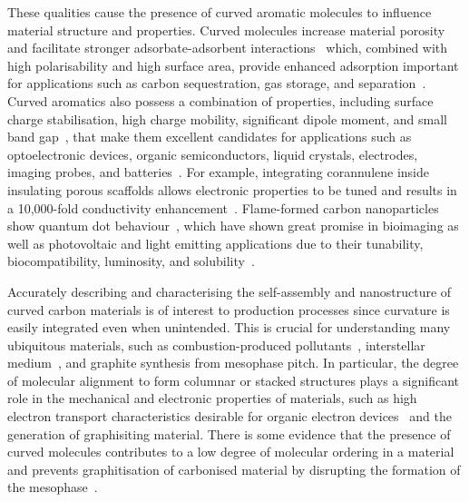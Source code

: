 These qualities cause the presence of curved aromatic molecules to influence material structure and properties. Curved molecules increase material porosity~\cite{Harris2005new} and facilitate stronger adsorbate-adsorbent interactions~\cite{Martin2017} which, combined with high polarisability and high surface area, provide enhanced adsorption important for applications such as carbon sequestration, gas storage, and separation~\cite{Scanlon2006investigation}. Curved aromatics also possess a combination of properties, including surface charge stabilisation, high charge mobility, significant dipole moment, and small band gap~\cite{Menon2019optical}, that make them excellent candidates for applications such as optoelectronic devices, organic semiconductors, liquid crystals, electrodes, imaging probes, and batteries~\cite{roch2017indenocorannulene}. For example, integrating corannulene inside insulating porous scaffolds allows electronic properties to be tuned and results in a 10,000-fold conductivity enhancement~\cite{rice2018stack}. Flame-formed carbon nanoparticles show quantum dot behaviour~\cite{liu2019flame}, which have shown great promise in bioimaging as well as photovoltaic and light emitting applications due to their tunability, biocompatibility, luminosity, and solubility~\cite{zhang2012graphene}.

Accurately describing and characterising the self-assembly and nanostructure of curved carbon materials is of interest to production processes since curvature is easily integrated even when unintended. This is crucial for understanding many ubiquitous materials, such as combustion-produced pollutants~\cite{Martin2018flexo}, interstellar medium~\cite{Lovas2005}, and graphite synthesis from mesophase pitch. In particular, the degree of molecular alignment to form columnar or stacked structures plays a significant role in the mechanical and electronic properties of materials, such as high electron transport characteristics desirable for organic electron devices~\cite{wang2015electronic} and the generation of graphisiting material. There is some evidence that the presence of curved molecules contributes to a low degree of molecular ordering in a material~\cite{zhong2018structural} and prevents graphitisation of carbonised material by disrupting the formation of the mesophase~\cite{abrahamson2018carbon}. 
%

